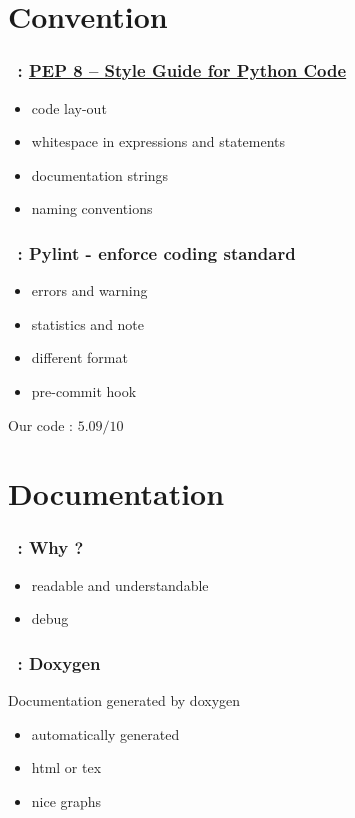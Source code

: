 \documentclass[a4paper, 11pt]{beamer}
\begin{document}
\section{Convention}
\begin{frame}
    \frametitle{\secname~: \href{https://www.python.org/dev/peps/pep-0008/}{PEP 8 -- Style Guide for Python Code}}
    \begin{itemize}
        \item code lay-out
        \item whitespace in expressions and statements
        \item documentation strings
        \item naming conventions
    \end{itemize}
\end{frame}

\begin{frame}
    \frametitle{\secname~: Pylint - enforce coding standard}
    \begin{itemize}
        \item errors and warning
        \item statistics and note 
        \item different format
        \item pre-commit hook 
    \end{itemize}  
    Our code : $5.09/10$
\end{frame}

\section{Documentation}
\begin{frame}
    \frametitle{\secname~: Why ?}
    \begin{itemize}
        \item readable and understandable
        \item debug
    \end{itemize}
\end{frame}

\begin{frame}
    \frametitle{\secname~: Doxygen}
    Documentation generated by doxygen
    \begin{itemize}
    	\item automatically generated
        \item html or tex
        \item nice graphs
    \end{itemize}
\end{frame}
\end{document}
